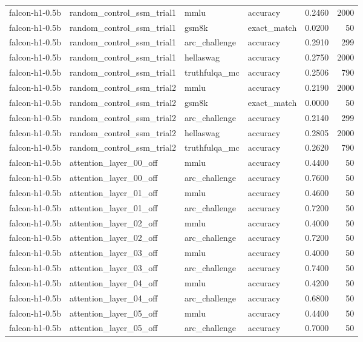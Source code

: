 \begin{tabular}{llllrr}
falcon-h1-0.5b & random_control_ssm_trial1 & mmlu & accuracy & 0.2460 & 2000 \\
falcon-h1-0.5b & random_control_ssm_trial1 & gsm8k & exact_match & 0.0200 & 50 \\
falcon-h1-0.5b & random_control_ssm_trial1 & arc_challenge & accuracy & 0.2910 & 299 \\
falcon-h1-0.5b & random_control_ssm_trial1 & hellaswag & accuracy & 0.2750 & 2000 \\
falcon-h1-0.5b & random_control_ssm_trial1 & truthfulqa_mc & accuracy & 0.2506 & 790 \\
falcon-h1-0.5b & random_control_ssm_trial2 & mmlu & accuracy & 0.2190 & 2000 \\
falcon-h1-0.5b & random_control_ssm_trial2 & gsm8k & exact_match & 0.0000 & 50 \\
falcon-h1-0.5b & random_control_ssm_trial2 & arc_challenge & accuracy & 0.2140 & 299 \\
falcon-h1-0.5b & random_control_ssm_trial2 & hellaswag & accuracy & 0.2805 & 2000 \\
falcon-h1-0.5b & random_control_ssm_trial2 & truthfulqa_mc & accuracy & 0.2620 & 790 \\
falcon-h1-0.5b & attention_layer_00_off & mmlu & accuracy & 0.4400 & 50 \\
falcon-h1-0.5b & attention_layer_00_off & arc_challenge & accuracy & 0.7600 & 50 \\
falcon-h1-0.5b & attention_layer_01_off & mmlu & accuracy & 0.4600 & 50 \\
falcon-h1-0.5b & attention_layer_01_off & arc_challenge & accuracy & 0.7200 & 50 \\
falcon-h1-0.5b & attention_layer_02_off & mmlu & accuracy & 0.4000 & 50 \\
falcon-h1-0.5b & attention_layer_02_off & arc_challenge & accuracy & 0.7200 & 50 \\
falcon-h1-0.5b & attention_layer_03_off & mmlu & accuracy & 0.4000 & 50 \\
falcon-h1-0.5b & attention_layer_03_off & arc_challenge & accuracy & 0.7400 & 50 \\
falcon-h1-0.5b & attention_layer_04_off & mmlu & accuracy & 0.4200 & 50 \\
falcon-h1-0.5b & attention_layer_04_off & arc_challenge & accuracy & 0.6800 & 50 \\
falcon-h1-0.5b & attention_layer_05_off & mmlu & accuracy & 0.4400 & 50 \\
falcon-h1-0.5b & attention_layer_05_off & arc_challenge & accuracy & 0.7000 & 50 \\

\end{tabular}
